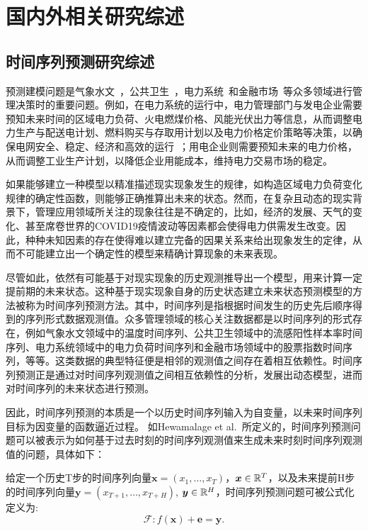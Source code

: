 \chapter[国内外相关研究综述]{国内外相关研究综述}

\section{时间序列预测研究综述}
预测建模问题是气象水文~\cite{mudelseeTrend2019}，公共卫生~\cite{chimmulaTime2020}，电力系统~\cite{qiuEmpirical2017}和金融市场~\cite{niuDeveloping2020}等众多领域进行管理决策时的重要问题。例如，在电力系统的运行中，电力管理部门与发电企业需要预知未来时间的区域电力负荷、火电燃煤价格、风能光伏出力等信息，从而调整电力生产与配送电计划、燃料购买与存取用计划以及电力价格定价策略等决策，以确保电网安全、稳定、经济和高效的运行~\cite{hu2015jiyu}；用电企业则需要预知未来的电力价格，从而调整工业生产计划，以降低企业用能成本，维持电力交易市场的稳定\cite{hongEnergy2020}。

如果能够建立一种模型以精准描述现实现象发生的规律，如构造区域电力负荷变化规律的确定性函数，则能够正确推算出未来的状态。然而，在复杂且动态的现实背景下，管理应用领域所关注的现象往往是不确定的，比如，经济的发展、天气的变化、甚至席卷世界的COVID19疫情波动等因素都会使得电力供需发生改变\cite{heHybrid2019,liuPower2022,obstAdaptive2021}。因此，种种未知因素的存在使得难以建立完备的因果关系来给出现象发生的定律，从而不可能建立出一个确定性的模型来精确计算现象的未来表现\cite{boxTime2011}。

尽管如此，依然有可能基于对现实现象的历史观测推导出一个模型，用来计算一定提前期的未来状态。这种基于现实现象自身的历史状态建立未来状态预测模型的方法被称为时间序列预测方法。其中，时间序列是指根据时间发生的历史先后顺序得到的序列形式数据观测值。众多管理领域的核心关注数据都是以时间序列的形式存在，例如气象水文领域中的温度时间序列、公共卫生领域中的流感阳性样本率时间序列、电力系统领域中的电力负荷时间序列和金融市场领域中的股票指数时间序列，等等。这类数据的典型特征便是相邻的观测值之间存在着相互依赖性。时间序列预测正是通过对时间序列观测值之间相互依赖性的分析，发展出动态模型，进而对时间序列的未来状态进行预测。

因此，时间序列预测的本质是一个以历史时间序列输入为自变量，以未来时间序列目标为因变量的函数逼近过程。
如Hewamalage et al.~\cite{hewamalageRecurrent2021}所定义的，时间序列预测问题可以被表示为如何基于过去时刻的时间序列观测值来生成未来时刻时间序列观测值的问题，具体如下：

给定一个历史T步的时间序列向量$\bm{x} = (x_1, \ldots, x_T)$，\(\bm{x} \in \mathbb{R}^{T}\)，以及未来提前H步的时间序列向量$\bm{y} = (x_{T+1},\ldots,x_{T+H})$, \(\bm{y} \in \mathbb{R}^{H}\)，时间序列预测问题可被公式化定义为:
\begin{equation}
    \mathcal{F} : f(\bm x) + \bm e = \bm y. \label{eq:sec.intro.def}
\end{equation}

